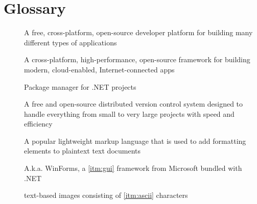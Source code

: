 \chapter*{Glossary}

\begin{description}
    \item [] A free, cross-platform, open-source developer platform for building many different types of applications \cite{microsoft_what_2022}
    \item [] A cross-platform, high-performance, open-source framework for building modern, cloud-enabled, Internet-connected apps \cite{anderson_overview_2022}
    \item [] Package manager for .NET projects \cite{microsoft_nuget_2022}
    \item [] A free and open-source distributed version control system designed to handle everything from small to very large projects with speed and efficiency \cite{git_git_2022}
    \item [] A popular lightweight markup language that is used to add formatting elements to plaintext text documents \cite{cone_getting_2022}
    \item [] A.k.a. WinForms, a \ref{itm:gui} framework from Microsoft bundled with .NET \cite{george_what_2022}
    \item [] text-based images consisting of \ref{itm:ascii} characters \cite{randal_ascii_2015}
\end{description}